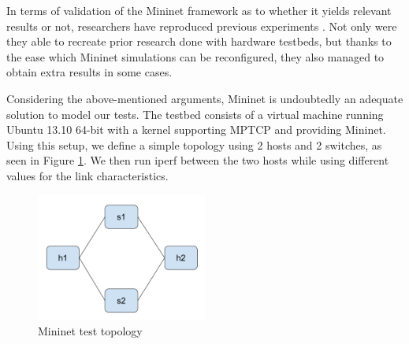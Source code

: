In terms of validation of the Mininet framework as to whether it yields
relevant results or not, researchers have reproduced previous experiments
\cite{mininet-reproduce}. Not only were they able to recreate prior research
done with hardware testbeds, but thanks to the ease which Mininet simulations
can be reconfigured, they also managed to obtain extra results in some cases.

Considering the above-mentioned arguments, Mininet is undoubtedly an adequate
solution to model our tests. The testbed consists of a virtual machine running
Ubuntu 13.10 64-bit with a kernel supporting MPTCP and providing Mininet.
Using this setup, we define a simple topology using 2 hosts and 2 switches, as
seen in Figure \ref{fig:mininet-topo}. We then run iperf between the two hosts
while using different values for the link characteristics.

\begin{figure}
  \centering
  \includegraphics[width=0.5\textwidth]{img/mininet-topo}
  \caption{Mininet test topology}
  \label{fig:mininet-topo}
\end{figure}

